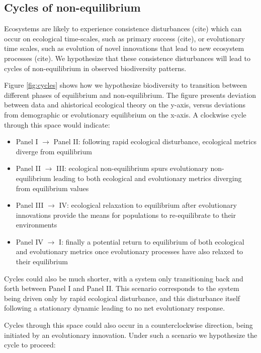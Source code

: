 \documentclass[12pt]{article}
\begin{document}
\subsection{Cycles of non-equilibrium}

Ecosystems are likely to experience consistence disturbances (cite)
which can occur on ecological time-scales, such as primary success
(cite), or evolutionary time scales, such as evolution of novel
innovations that lead to new ecosystem processes (cite). We
hypothesize that these consistence disturbances will lead to cycles of
non-equilibrium in observed biodiversity patterns.

Figure \ref{fig:cycles} shows how we hypothesize biodiversity to
transition between different phases of equilibrium and
non-equilibrium. The figure presents deviation between data and
ahistorical ecological theory on the y-axis, versus deviations from
demographic or evolutionary equilibrium on the x-axis. A clockwise
cycle through this space would indicate:

\begin{itemize}
\item Panel I $\rightarrow$ Panel II: following rapid ecological
  disturbance, ecological metrics diverge from equilibrium
\item Panel II $\rightarrow$ III: ecological non-equilibrium spurs
  evolutionary non-equilibrium leading to both ecological and
  evolutionary metrics diverging from equilibrium values
\item Panel III $\rightarrow$ IV: ecological relaxation to equilibrium
  after evolutionary innovations provide the means for populations to
  re-equilibrate to their environments
\item Panel IV $\rightarrow$ I: finally a potential return to
  equilibrium of both ecological and evolutionary metrics once
  evolutionary processes have also relaxed to their equilibrium
\end{itemize}

Cycles could also be much shorter, with a system only transitioning
back and forth between Panel I and Panel II. This scenario corresponds
to the system being driven only by rapid ecological disturbance, and
this disturbance itself following a stationary dynamic leading to no
net evolutionary response.

Cycles through this space could also occur in a counterclockwise
direction, being initiated by an evolutionary innovation. Under such a
scenario we hypothesize the cycle to proceed:
\end{document}
